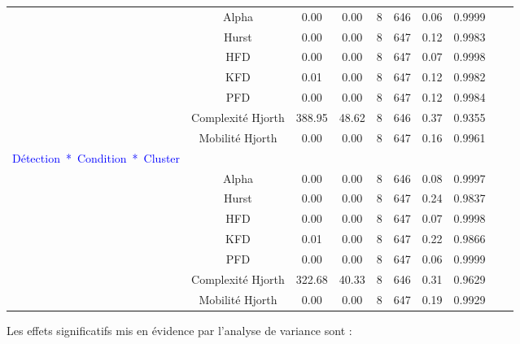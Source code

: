 \begin{table}[!t]
\begin{tabular}{|l|*{9}{c|}}
\hline
& Alpha & 0.00 & 0.00 & 8 & 646 & 0.06 & 0.9999 & \\ 
& Hurst & 0.00 & 0.00 & 8 & 647 & 0.12 & 0.9983 & \\
& HFD & 0.00 & 0.00 & 8 & 647 & 0.07 & 0.9998 & \\ 
& KFD & 0.01 & 0.00 & 8 & 647 & 0.12 & 0.9982 & \\ 
& PFD & 0.00 & 0.00 & 8 & 647 & 0.12 & 0.9984 & \\ 
& Complexité Hjorth & 388.95 & 48.62 & 8 & 646 & 0.37 & 0.9355 & \\ 
& Mobilité Hjorth & 0.00 & 0.00 & 8 & 647 & 0.16 & 0.9961 & \\ 
\hline
\textcolor{blue}{Détection~*~Condition~*~Cluster} & & & & & & & & \\ 
\hline
& Alpha & 0.00 & 0.00 & 8 & 646 & 0.08 & 0.9997 & \\ 
& Hurst & 0.00 & 0.00 & 8 & 647 & 0.24 & 0.9837 & \\ 
& HFD & 0.00 & 0.00 & 8 & 647 & 0.07 & 0.9998 & \\ 
& KFD & 0.01 & 0.00 & 8 & 647 & 0.22 & 0.9866 & \\ 
& PFD & 0.00 & 0.00 & 8 & 647 & 0.06 & 0.9999 & \\ 
& Complexité Hjorth & 322.68 & 40.33 & 8 & 646 & 0.31 & 0.9629 & \\ 
& Mobilité Hjorth & 0.00 & 0.00 & 8 & 647 & 0.19 & 0.9929 & \\ 
\hline
\end{tabular}

\end{table}

Les effets significatifs mis en évidence par l'analyse de variance sont :

